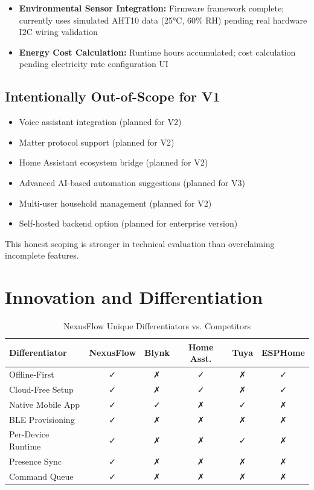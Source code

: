 \begin{itemize}
    \item \textbf{Environmental Sensor Integration:} Firmware framework complete; currently uses simulated AHT10 data (25°C, 60\% RH) pending real hardware I2C wiring validation
    \item \textbf{Energy Cost Calculation:} Runtime hours accumulated; cost calculation pending electricity rate configuration UI
\end{itemize}

\subsection{Intentionally Out-of-Scope for V1}

\begin{itemize}
    \item Voice assistant integration (planned for V2)
    \item Matter protocol support (planned for V2)
    \item Home Assistant ecosystem bridge (planned for V2)
    \item Advanced AI-based automation suggestions (planned for V3)
    \item Multi-user household management (planned for V2)
    \item Self-hosted backend option (planned for enterprise version)
\end{itemize}

This honest scoping is stronger in technical evaluation than overclaiming incomplete features.

\section{Innovation and Differentiation}

\begin{table}[H]
\centering
\caption{NexusFlow Unique Differentiators vs. Competitors}
\label{tbl:innovation}
\begin{tabular}{|l|c|c|c|c|c|}
\hline
\textbf{Differentiator} & \textbf{NexusFlow} & \textbf{Blynk} & \textbf{Home Asst.} & \textbf{Tuya} & \textbf{ESPHome} \\
\hline
Offline-First & ✓ & ✗ & ✓ & ✗ & ✓ \\
\hline
Cloud-Free Setup & ✓ & ✗ & ✓ & ✗ & ✓ \\
\hline
Native Mobile App & ✓ & ✓ & ✗ & ✓ & ✗ \\
\hline
BLE Provisioning & ✓ & ✗ & ✗ & ✗ & ✗ \\
\hline
Per-Device Runtime & ✓ & ✗ & ✗ & ✓ & ✗ \\
\hline
Presence Sync & ✓ & ✗ & ✗ & ✗ & ✗ \\
\hline
Command Queue & ✓ & ✗ & ✗ & ✗ & ✗ \\
\hline
\end{tabular}
\end{table}

